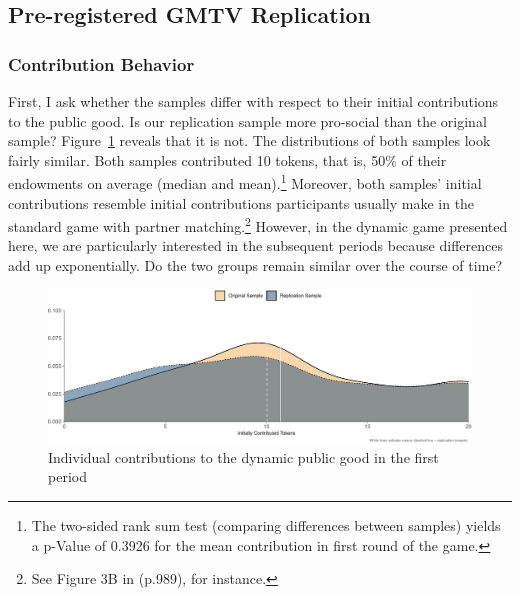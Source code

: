 \documentclass[
  authoryear,
  preprint,
  3p]{elsarticle}
\begin{document}
\hypertarget{sec-replication}{%
\subsection{Pre-registered GMTV Replication}\label{sec-replication}}

\hypertarget{sec-contributions}{%
\subsubsection{Contribution Behavior}\label{sec-contributions}}

First, I ask whether the samples differ with respect to their initial
contributions to the public good. Is our replication sample more
pro-social than the original sample? Figure~\ref{fig-first-round}
reveals that it is not. The distributions of both samples look fairly
similar. Both samples contributed 10 tokens, that is, 50\% of their
endowments on average (median and mean).\footnote{The two-sided rank sum
  test (comparing differences between samples) yields a p-Value of
  0.3926 for the mean contribution in first round of the game.}
Moreover, both samples' initial contributions resemble initial
contributions participants usually make in the standard game with
partner matching.\footnote{See Figure 3B in \citet{fehrgaechter2000}
  (p.989), for instance.} However, in the dynamic game presented here,
we are particularly interested in the subsequent periods because
differences add up exponentially. Do the two groups remain similar over
the course of time?

\begin{figure}

{\centering \includegraphics{paper_files/figure-pdf/fig-first-round-1.pdf}

}

\caption{\label{fig-first-round}Individual contributions to the dynamic
public good in the first period}

\end{figure}
\end{document}
